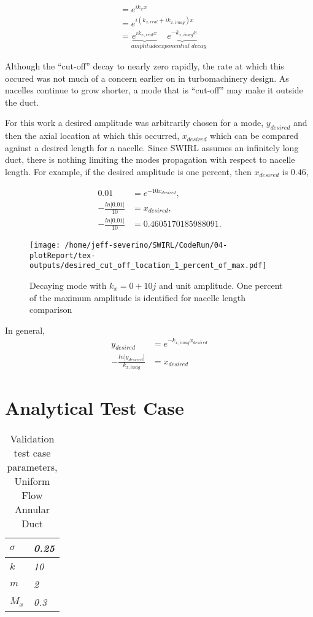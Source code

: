 \documentclass[a4paper]{report}
\begin{document}
\begin{align}
    &= e^{i k_x x} \\
    &= e^{i (k_{x,real}+ i k_{x,imag}) x} \\
    &= \underbrace{e^{i k_{x,real}x}}_{\textit{amplitude}} \underbrace{e^{- k_{x,imag} x}}_{\textit{exponential decay}} 
\end{align}

Although the ``cut-off'' decay to nearly zero rapidly, the rate at which this occured
was not much of a concern earlier on in turbomachinery design. As nacelles 
continue to grow shorter, a mode that is ``cut-off'' may make it outside the duct.

For this work a desired amplitude was arbitrarily chosen for a mode, $y_{desired}$
and then the axial location at which this occurred, $x_{desired}$ which 
can be compared against a desired length for a nacelle.  
Since SWIRL assumes an infinitely long duct, there is nothing limiting the 
modes propagation with respect to nacelle length. For example, if the 
desired amplitude is one percent, then $x_{desired}$ is $0.46$, 

\begin{align*}
    0.01 &=  e^{-10 x_{desired}},\\
    -\frac{ln|0.01|}{10} &=  x_{desired},\\
    -\frac{ln|0.01|}{10} &= 0.4605170185988091 .
\end{align*}


 \begin{figure}
     \centering
     \texttt{[image: /home/jeff-severino/SWIRL/CodeRun/04-plotReport/tex-outputs/desired\_cut\_off\_location\_1\_percent\_of\_max.pdf]}
     \caption{Decaying mode with $k_x = 0 + 10j$ and unit amplitude. One percent
     of the maximum amplitude is identified for nacelle length comparison}
     \label{fig:decaying_mode_with_1_percent_amp}
 \end{figure}
 
 
In general,
\begin{align*}
    y_{desired} &=  e^{-k_{x,imag} x_{desired} }\\
    -\frac{ln|y_{desired}|}{k_{x,imag}} &=  x_{desired}
\end{align*}
\section{Analytical Test Case}
\begin{table}[!h]
    \centering
    \begin{tabular}{|l|l|}
        \hline
        $\sigma$ & \textit{0.25} \\ \hline
        $k$      & \textit{10}   \\ \hline
        $m$      & \textit{2}    \\ \hline
        $M_x$    & \textit{0.3}  \\ \hline
    \end{tabular}
    \caption{Validation test case parameters, Uniform Flow Annular Duct} 
\end{table}
\end{document}
